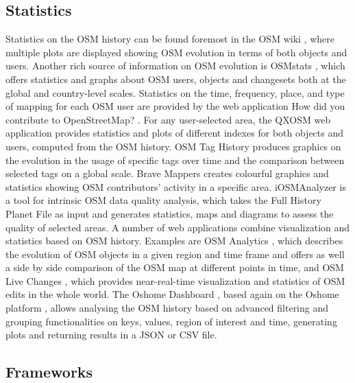 \documentclass{Configuration_Files/PoliMi3i_thesis}
\begin{document}
\subsection{Statistics}

Statistics on the OSM history can be found foremost in the OSM wiki \cite{StatsOpenStreetMapWiki}, where multiple plots are displayed showing OSM evolution in terms of both objects and users. Another rich source of information on OSM evolution is OSMstats \cite{OSMstatsStatisticsFree}, which offers statistics and graphs about OSM users, objects and changesets both at the global and country-level scales. Statistics on the time, frequency, place, and type of mapping for each OSM user are provided by the web application How did you contribute to OpenStreetMap? \cite{HowDidYou}. For any user-selected area, the QXOSM web application \cite{QXOSM, almendros-jimenezAnalyzingTaggingQuality2018} provides statistics and plots of different indexes for both objects and users, computed from the OSM history.
OSM Tag History \cite{OsmTagHistory} produces graphics on the evolution in the usage of specific tags over time and the comparison between selected tags on a global scale. Brave Mappers \cite{BraveMappersCounty} creates colourful graphics and statistics showing OSM contributors' activity in a specific area. iOSMAnalyzer \cite{barronComprehensiveFrameworkIntrinsic2014} is a tool for intrinsic OSM data quality analysis, which takes the Full History Planet File as input and generates statistics, maps and diagrams to assess the quality of selected areas. A number of web applications combine visualization and statistics based on OSM history. Examples are OSM Analytics \cite{OsmanalyticsDataAnalysis2022}, which describes the evolution of OSM objects in a given region and time frame and offers as well a side by side comparison of the OSM map at different points in time, and OSM Live Changes \cite{OpenStreetMapLiveEdits}, which provides near-real-time visualization and statistics of OSM edits in the whole world. The Oshome Dashboard \cite{OhsomeDashboard}, based again on the Oshome platform \cite{OhsomeHeidelbergInstitute}, allows analysing the OSM history based on advanced filtering and grouping functionalities on keys, values, region of interest and time, generating plots and returning results in a JSON or CSV file.

\subsection{Frameworks}
\end{document}
